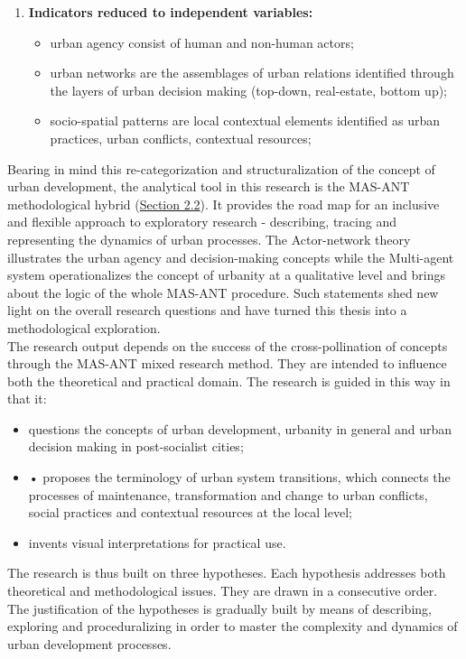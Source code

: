\documentclass[11pt]{report}
\begin{document}
{{{{\begin{enumerate}
\item \textbf{Indicators reduced to independent variables:}
\begin{itemize}
\item urban agency consist of human and non-human actors;
\item urban networks are the assemblages of urban relations identified through the layers of urban decision making (top-down, real-estate, bottom up);
\item socio-spatial patterns are local contextual elements identified as urban practices, urban conflicts, contextual resources;
\end{itemize}
\end{enumerate}

Bearing in mind this re-categorization and structuralization of the concept of urban development, the analytical tool in this research is the MAS-ANT methodological hybrid (\href{Section 2.2}{Section 2.2}). 
It provides the road map for an inclusive and flexible approach to exploratory research - describing, tracing and representing the dynamics of urban processes. The Actor-network theory illustrates the urban agency and decision-making concepts while the Multi-agent system operationalizes the concept of urbanity at a qualitative level and brings about the logic of the whole MAS-ANT procedure. Such statements shed new light on the overall research questions and have turned this thesis into a methodological exploration.
\\

The research output depends on the success of the cross-pollination of concepts through the MAS-ANT mixed research method. They are intended to influence both the theoretical and practical domain. The research is guided in this way in that it:
\begin{itemize}
\item questions the concepts of urban development, urbanity in general and urban decision making in post-socialist cities;
\item •	proposes the terminology of urban system transitions, which connects the processes of maintenance, transformation and change to urban conflicts, social practices and contextual resources at the local level;
\item invents visual interpretations for practical use.
\end{itemize}

The research is thus built on three hypotheses. Each hypothesis addresses both theoretical and methodological issues. They are drawn in a consecutive order. The justification of the hypotheses is gradually built by means of describing, exploring and proceduralizing in order to master the complexity and dynamics of urban development processes. 

}}}}
\end{document}
